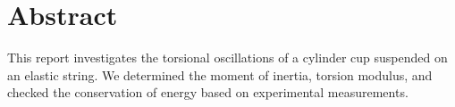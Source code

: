 \chapter{Abstract}

This report investigates the torsional oscillations of a cylinder cup suspended on an elastic string. We determined the moment of inertia, torsion modulus, and checked the conservation of energy based on experimental measurements.
